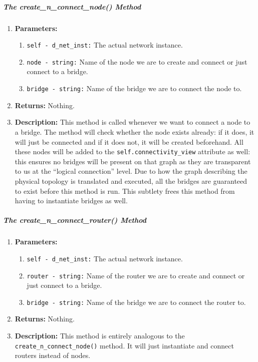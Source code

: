     \subparagraph{The create\_n\_connect\_node() Method}
        \begin{enumerate}
            \item \textbf{Parameters:}
            \begin{enumerate}
                \item \texttt{self - d\_net\_inst:} The actual network instance.
                \item \texttt{node - string:} Name of the node we are to create and connect or just connect to a bridge.
                \item \texttt{bridge - string:} Name of the bridge we are to connect the node to.
            \end{enumerate}
            \item \textbf{Returns:} Nothing.
            \item \textbf{Description:} This method is called whenever we want to connect a node to a bridge. The method will check whether the node exists already: if it does, it will just be connected and if it does not, it will be created beforehand. All these nodes will be added to the \texttt{self.connectivity\_view} attribute as well: this ensures no bridges will be present on that graph as they are transparent to us at the ``logical connection'' level. Due to how the graph describing the physical topology is translated and executed, all the bridges are guaranteed to exist before this method is run. This subtlety frees this method from having to instantiate bridges as well.
        \end{enumerate}

    \subparagraph{The create\_n\_connect\_router() Method}
        \begin{enumerate}
            \item \textbf{Parameters:}
            \begin{enumerate}
                \item \texttt{self - d\_net\_inst:} The actual network instance.
                \item \texttt{router - string:} Name of the router we are to create and connect or just connect to a bridge.
                \item \texttt{bridge - string:} Name of the bridge we are to connect the router to.
            \end{enumerate}
            \item \textbf{Returns:} Nothing.
            \item \textbf{Description:} This method is entirely analogous to the \texttt{create\_n\_connect\_node()} method. It will just instantiate and connect routers instead of nodes.
        \end{enumerate}

